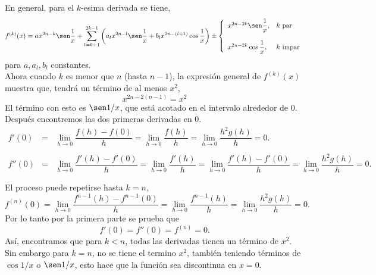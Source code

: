 \begin{enumerate}[\bfseries 1.]
	 En general, para el $k$-esima derivada se tiene,
	 $$f^{(k)}(x)=ax^{2n-k}\sen \dfrac{1}{x}+\sum_{l=k+1}^{2k-1}\left(a_l x^{2n-l}\sen \dfrac{1}{x}+b_lx^{2n-(l+1)}\cos \dfrac{1}{x}\right)\pm \left\{\begin{array}{ll}
		 x^{2n-2k}\sen \dfrac{1}{x},&k\mbox{ par}\\\\
		 x^{2n-2k}\cos \dfrac{1}{x},&k\mbox{ impar}\\
	 \end{array}\right.$$
	 para $a,a_l,b_l$ constantes.\\

	 Ahora cuando $k$ es menor que $n$ (hasta $n-1$), la expresión general de $f^{(k)}(x)$ muestra que, tendrá un término de al menos $x^2$,
	 $$x^{2n-2(n-1)}=x^2$$
	 El término con esto es $\sen 1/x$, que está acotado en el intervalo alrededor de $0$.\\

	 Después encontremos las dos primeras derivadas en $0$.
	 $$\begin{array}{rcl}
	     f'(0)&=&\lim\limits_{h\to 0}\dfrac{f(h)-f(0)}{h}=\lim\limits_{h\to 0}\dfrac{f(h)}{h}=\lim\limits_{h\to 0}\dfrac{h^2g(h)}{h}=0.\\\\
	     f''(0) &=& \lim\limits_{h\to 0}\dfrac{f'(h)-f'(0)}{h}=\lim\limits_{h\to 0}\dfrac{f'(h)}{h}=\lim\limits_{h\to 0}\dfrac{f'(h)-f'(0)}{h}=\lim\limits_{h\to 0}\dfrac{h^2g(h)}{h}=0.\\\\
	 \end{array}$$
	 El proceso puede repetirse hasta $k=n$,
	 $$f^{(n)}(0)=\lim_{h\to 0}\dfrac{f^{n-1}(h)-f^{n-1}(0)}{h}=\lim_{h\to 0}\dfrac{f^{n-1}(h)}{h}=\lim_{h\to 0}\dfrac{h^2g(h)}{h}=0.$$
	 Por lo tanto por la primera parte se prueba que 
	 $$f'(0)=f''(0)=f^{(n)}=0.$$
	 Así, encontramos que para $k< n$, todas las derivadas tienen un término de $x^2$. Sin embargo para $k=n$, no se tiene el termino $x^2$, también teniendo términos de $\cos 1/x$ o $\sen 1/x$, esto hace que la función sea discontinua en $x=0.$\\\\



\end{enumerate}
